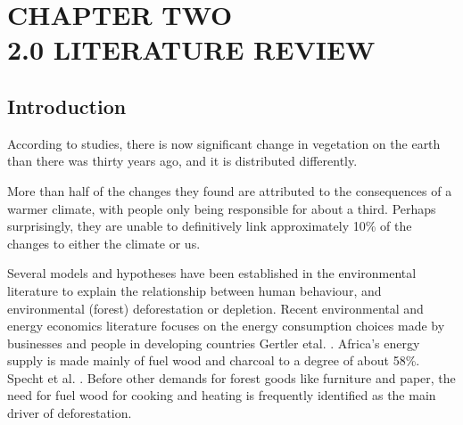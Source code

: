 
\chapter{CHAPTER TWO\\2.0 LITERATURE REVIEW} %

\label{Chapter2} %



\section{Introduction}
According to studies, there is now significant change in vegetation on the earth than there was thirty years ago, and it is distributed differently.

More than half of the changes they found are attributed to the consequences of a warmer climate, with people only being responsible for
about a third. Perhaps surprisingly, they are unable to definitively link approximately 10\% of the changes to either the climate or us.\parencite{alex2013}

Several models and hypotheses have been established in the environmental literature to explain the relationship between human behaviour, and
environmental (forest) deforestation or depletion. Recent environmental and energy economics literature focuses on the energy consumption
choices made by businesses and people in developing countries Gertler etal. \parencite{gertler2016}. Africa's energy supply
is made mainly of fuel wood and charcoal to a degree of about 58\%. Specht et al. \parencite{specht2015} . Before other
demands for forest goods like furniture and paper, the need for fuel wood for cooking and heating is frequently identified as the main driver
of deforestation.

